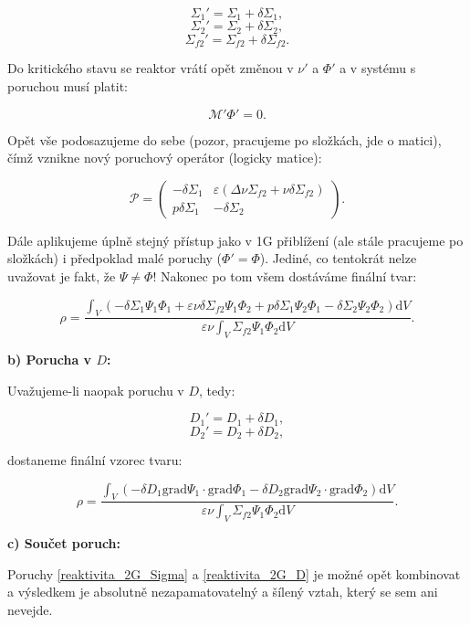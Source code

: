 $$ \Sigma_1' = \Sigma_1 + \delta \Sigma_1, $$
$$ \Sigma_2' = \Sigma_2 + \delta \Sigma_2, $$
$$ \Sigma_{f2}' = \Sigma_{f2} + \delta \Sigma_{f2}. $$

Do kritického stavu se reaktor vrátí opět změnou v $\nu'$ a $\Phi'$ a v systému s poruchou musí platit:

$$ \mathcal{M'} \Phi' = 0. $$

Opět vše podosazujeme do sebe (pozor, pracujeme po složkách, jde o matici), čímž vznikne nový poruchový operátor (logicky matice):

$$ \mathcal{P} = \begin{pmatrix} - \delta \Sigma_1 & \varepsilon(\Delta \nu \Sigma_{f2} + \nu \delta \Sigma_{f2}) \\ p \delta \Sigma_1 & - \delta \Sigma_2 \end{pmatrix}. $$

Dále aplikujeme úplně stejný přístup jako v 1G přiblížení (ale stále pracujeme po složkách) i předpoklad malé poruchy ($\Phi' = \Phi$). Jediné, co tentokrát nelze uvažovat je fakt, že $\Psi \neq \Phi$! Nakonec po tom všem dostáváme finální tvar:

\begin{equation}
  \boxed{
  \rho = \dfrac{\int_V \left ( - \delta \Sigma_1 \Psi_1 \Phi_1 + \varepsilon \nu \delta \Sigma_{f2} \Psi_1 \Phi_2 + p \delta \Sigma_1 \Psi_2 \Phi_1 - \delta \Sigma_2 \Psi_2 \Phi_2 \right ) \text{d}V}{\varepsilon \nu \int_V \Sigma_{f2} \Psi_1 \Phi_2 \text{d}V}.
  \label{reaktivita_2G_Sigma}}
\end{equation}

\textbf{b) Porucha v $D$:}

Uvažujeme-li naopak poruchu v $D$, tedy:

$$ D_1' = D_1 + \delta D_1, $$
$$ D_2' = D_2 + \delta D_2, $$

dostaneme finální vzorec tvaru:

\begin{equation}
  \boxed{
  \rho = \dfrac{\int_V \left ( - \delta D_1 \text{grad} \Psi_1 \cdot \text{grad} \Phi_1 - \delta D_2 \text{grad} \Psi_2 \cdot \text{grad} \Phi_2 \right ) \text{d}V}{\varepsilon \nu \int_V \Sigma_{f2} \Psi_1 \Phi_2 \text{d}V}.
  \label{reaktivita_2G_D}}
\end{equation}

\textbf{c) Součet poruch:}

Poruchy \eqref{reaktivita_2G_Sigma} a \eqref{reaktivita_2G_D} je možné opět kombinovat a výsledkem je absolutně nezapamatovatelný a šílený vztah, který se sem ani nevejde.\\


